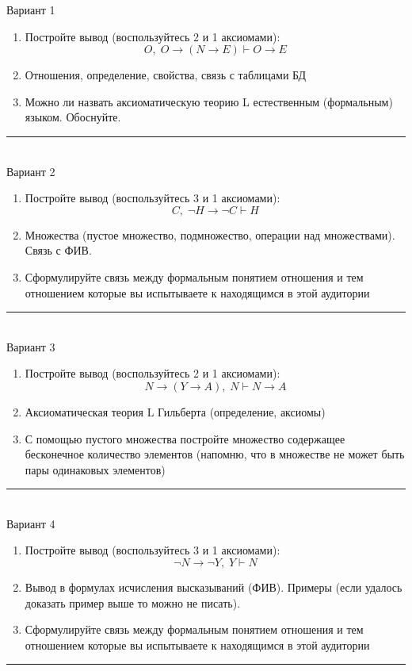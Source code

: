 \documentclass[10pt,a4paper]{article}
\begin{document}
\begin{multicols}{2}



Вариант 1
\begin{enumerate}
\item Постройте вывод (воспользуйтесь 2 и 1 аксиомами): $$O,\;O\to(N\to E) \vdash O\to E$$
\item Отношения, определение, свойства, связь с таблицами БД
\item Можно ли назвать аксиоматическую теорию L естественным (формальным) языком. Обоснуйте.
\end{enumerate}
\noindent\rule{\columnwidth}{0.1pt} \\
    


Вариант 2
\begin{enumerate}
\item Постройте вывод (воспользуйтесь 3 и 1 аксиомами): $$C,\; \neg H \to \neg C \vdash H$$
\item Множества (пустое множество, подмножество, операции над множествами). Связь с ФИВ.
\item Сформулируйте связь между формальным понятием отношения и тем отношением которые вы испытываете к находящимся в этой аудитории
\end{enumerate}
\noindent\rule{\columnwidth}{0.1pt} \\
    


Вариант 3
\begin{enumerate}
\item Постройте вывод (воспользуйтесь 2 и 1 аксиомами): $$N\to(Y\to A),\;N \vdash N\to A$$
\item Аксиоматическая теория L Гильберта (определение, аксиомы)
\item С помощью пустого множества постройте множество содержащее бесконечное количество элементов (напомню, что в множестве не может быть пары одинаковых элементов)
\end{enumerate}
\noindent\rule{\columnwidth}{0.1pt} \\
    


Вариант 4
\begin{enumerate}
\item Постройте вывод (воспользуйтесь 3 и 1 аксиомами): $$\neg N \to \neg Y,\; Y \vdash N$$
\item Вывод в формулах исчисления высказываний (ФИВ). Примеры (если удалось доказать пример выше то можно не писать).
\item Сформулируйте связь между формальным понятием отношения и тем отношением которые вы испытываете к находящимся в этой аудитории
\end{enumerate}
\noindent\rule{\columnwidth}{0.1pt} \\
    

\end{multicols}
\end{document}
